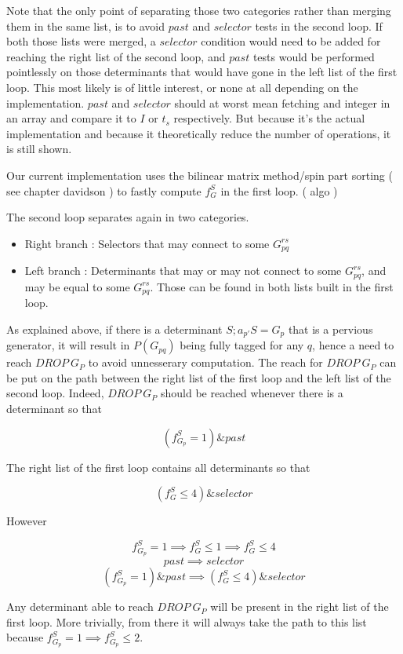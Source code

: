 \documentclass[./thesis.tex]{subfiles}
\begin{document}
Note that the only point of separating those two categories rather than merging them in the same list, is to avoid $past$ and $selector$ tests in the second loop. If both those lists were merged, a $selector$ condition would need to be added for reaching the right list of the second loop, and $past$ tests would be performed pointlessly on those determinants that would have gone in the left list of the first loop.
This most likely is of little interest, or none at all depending on the implementation. $past$ and $selector$ should at worst mean fetching and integer in an array and compare it to $I$ or $t_s$ respectively. But because it's the actual implementation and because it theoretically reduce the number of operations, it is still shown.

Our current implementation uses the bilinear matrix method/spin part sorting ( see chapter davidson ) to fastly compute $f_G^S$ in the first loop. ( algo )


The second loop separates again in two categories.

\begin{itemize}
\item
Right branch : Selectors that may connect to some $G_{pq}^{rs}$
\item
Left branch : Determinants that may or may not connect to some $G_{pq}^{rs}$, and may be equal to some $G_{pq}^{rs}$. Those can be found in both lists built in the first loop.
\end{itemize}

As explained above, if there is a determinant $S ; a_{p'}S = G_{p}$ that is a pervious generator, it will result in $P(G_{pq})$ being fully tagged for any $q$, hence a need to reach $DROP\ G_P$ to avoid unnesserary computation.
The reach for $DROP\ G_P$ can be put on the path between the right list of the first loop and the left list of the second loop.
Indeed, $DROP\ G_P$ should be reached whenever there is a determinant so that

$$(f^S_{G_{p}} = 1) \& past$$

The right list of the first loop contains all determinants so that

$$(f^S_G \leq 4) \& selector$$

However 

$$f^S_{G_{p}} = 1 \implies f^S_G \leq 1 \implies f^S_G \leq 4$$
$$past \implies selector$$
$$(f^S_{G_{p}} = 1) \& past \implies (f^S_G \leq 4) \& selector$$


Any determinant able to reach $DROP\ G_P$ will be present in the right list of the first loop. More trivially, from there it will always take the path to this list because $f^S_{G_{p}} = 1 \implies f^S_{G_{p}} \leq 2$.
\end{document}
